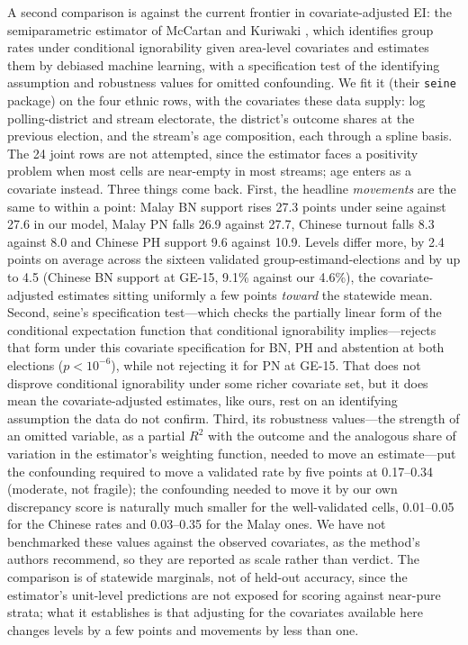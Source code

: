 \documentclass[11pt]{article}
\begin{document}
A second comparison is against the current frontier in covariate-adjusted EI: the semiparametric estimator of McCartan and Kuriwaki \cite{mccartankuriwaki2025}, which identifies group rates under conditional ignorability given area-level covariates and estimates them by debiased machine learning, with a specification test of the identifying assumption and robustness values for omitted confounding. We fit it (their \texttt{seine} package) on the four ethnic rows, with the covariates these data supply: log polling-district and stream electorate, the district's outcome shares at the previous election, and the stream's age composition, each through a spline basis. The 24 joint rows are not attempted, since the estimator faces a positivity problem when most cells are near-empty in most streams; age enters as a covariate instead. Three things come back. First, the headline \emph{movements} are the same to within a point: Malay BN support rises 27.3 points under seine against 27.6 in our model, Malay PN falls 26.9 against 27.7, Chinese turnout falls 8.3 against 8.0 and Chinese PH support 9.6 against 10.9. Levels differ more, by 2.4 points on average across the sixteen validated group-estimand-elections and by up to 4.5 (Chinese BN support at GE-15, 9.1\% against our 4.6\%), the covariate-adjusted estimates sitting uniformly a few points \emph{toward} the statewide mean. Second, seine's specification test---which checks the partially linear form of the conditional expectation function that conditional ignorability implies---rejects that form under this covariate specification for BN, PH and abstention at both elections ($p < 10^{-6}$), while not rejecting it for PN at GE-15. That does not disprove conditional ignorability under some richer covariate set, but it does mean the covariate-adjusted estimates, like ours, rest on an identifying assumption the data do not confirm. Third, its robustness values---the strength of an omitted variable, as a partial $R^2$ with the outcome and the analogous share of variation in the estimator's weighting function, needed to move an estimate---put the confounding required to move a validated rate by five points at 0.17--0.34 (moderate, not fragile); the confounding needed to move it by our own discrepancy score is naturally much smaller for the well-validated cells, 0.01--0.05 for the Chinese rates and 0.03--0.35 for the Malay ones. We have not benchmarked these values against the observed covariates, as the method's authors recommend, so they are reported as scale rather than verdict. The comparison is of statewide marginals, not of held-out accuracy, since the estimator's unit-level predictions are not exposed for scoring against near-pure strata; what it establishes is that adjusting for the covariates available here changes levels by a few points and movements by less than one.
\end{document}
